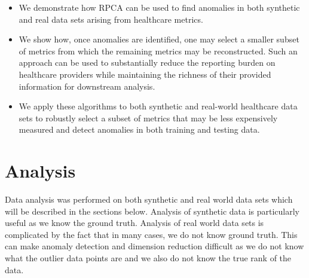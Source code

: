 \documentclass[conference]{IEEEtran}
\begin{document}
\begin{itemize}
    \item We demonstrate how RPCA can be used to find anomalies in both synthetic and real data sets arising from healthcare metrics.   
    \item We show how, once anomalies are identified, one may select a smaller subset of metrics from which the remaining metrics may be reconstructed.   Such an approach can be used to substantially reduce the reporting burden on healthcare providers while maintaining the richness of their provided information for downstream analysis.
    \item We apply these algorithms to both synthetic and real-world healthcare data sets to robustly select a subset of metrics that may be less expensively measured and detect anomalies in both training and testing data.
\end{itemize}

\section{Analysis}
Data analysis was performed on both synthetic and real world data sets which will be described in the sections below. Analysis of synthetic data is particularly useful as we know the ground truth. Analysis of real world data sets is complicated by the fact that in many cases, we do not know ground truth.  This can make anomaly detection and dimension reduction difficult as we do not know what the outlier data points are and we also do not know the true rank of the data.



\end{document}
